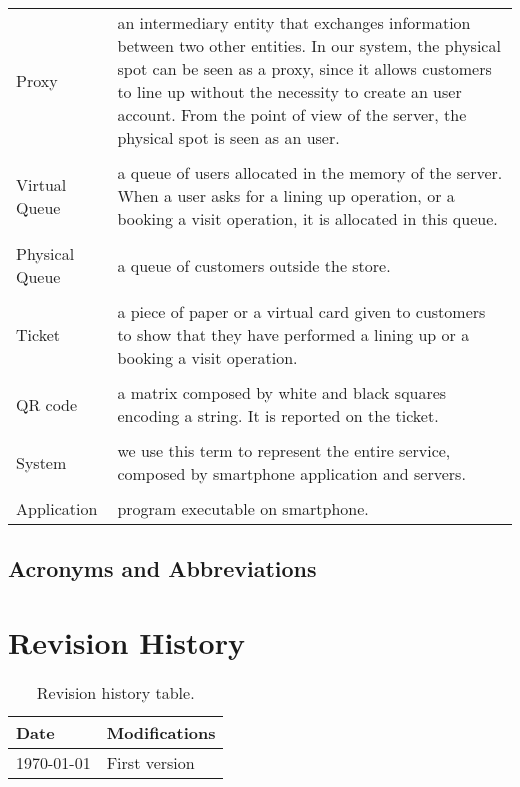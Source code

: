 \begin{tabularx}{\textwidth}{ >{\hsize=0.2\textwidth}X >{\hsize=0.8\textwidth}X}
    Proxy          & an intermediary entity that exchanges information between two other entities. In our system, the physical spot can be seen as a proxy, since it allows customers to line up without the necessity to create an user account. From the point of view of the server, the physical spot is seen as an user. \\ \\
    Virtual Queue & a queue of users allocated in the memory of the server. When a user asks for a lining up operation, or a booking a visit operation, it is allocated in this queue.\\ \\
    Physical Queue & a queue of customers outside the store.\\ \\
    Ticket & a piece of paper or a virtual card given to customers to show that they have performed a lining up or a booking a visit operation.\\ \\
    QR code & a matrix composed by white and black squares encoding a string. It is reported on the ticket.         \\ \\
    System & we use this term to represent the entire service, composed by smartphone application and servers.\\ \\
    Application & program executable on smartphone.
\end{tabularx}

\subsection{Acronyms and Abbreviations}
\printglossary


\section{Revision History}

\begin{table}[H]
    \centering
    \begin{tabular}{ m{} | m{} }
        \textbf{Date} & \textbf{Modifications} \\
        \hline
        \today        & First version          \\
    \end{tabular}
    \caption{Revision history table.}
    \label{table:revisionHistory}
\end{table}


